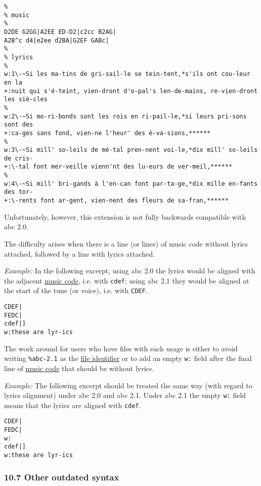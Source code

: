 \begin{verbatim}
%
% music
%
D2DE G2GG|A2EE ED-D2|c2cc B2AG|
A2B^c d4|e2ee d2BA|G2EF GABc|
%
% lyrics
%
w:1\-~Si les ma-tins de gri-sail-le se tein-tent,*s'ils ont cou-leur en la
+:nuit qui s'é-teint, vien-dront d'o-pal's len-de-mains, re-vien-dront les siè-cles
%
w:2\-~Si mo-ri-bonds sont les rois en ri-pail-le,*si leurs pri-sons sont des
+:ca-ges sans fond, vien-ne l'heur' des é-va-sions,******
%
w:3\-~Si mill' so-leils de mé-tal pren-nent voi-le,*dix mill' so-leils de cris-
+:\-tal font mer-veille vienn'nt des lu-eurs de ver-meil,******
%
w:4\-~Si mill' bri-gands à l'en-can font par-ta-ge,*dix mille en-fants des tor-
+:\-rents font ar-gent, vien-nent des fleurs de sa-fran,******
\end{verbatim}

Unfortunately, however, this extension is not fully backwards compatible
with abc 2.0.

The difficulty arises when there is a line (or lines) of music code
without lyrics attached, followed by a line with lyrics attached.

\emph{Example:} In the following excerpt, using abc 2.0 the lyrics would
be aligned with the adjacent
\protect\hyperlink{music_code_definition}{music code}, i.e. with
\texttt{cdef}; using abc 2.1 they would be aligned at the start of the
tune (or voice), i.e. with \texttt{CDEF}.

\begin{verbatim}
CDEF|
FEDC|
cdef|]
w:these are lyr-ics
\end{verbatim}

The work around for users who have files with such usage is either to
avoid writing \texttt{\%abc-2.1} as the
\protect\hyperlink{abc_file_identification}{file identifier} or to add
an empty \texttt{w:} field after the final line of
\protect\hyperlink{music_code_definition}{music code} that should be
without lyrics.

\emph{Example:} The following excerpt should be treated the same way
(with regard to lyrics alignment) under abc 2.0 and abc 2.1. Under abc
2.1 the empty \texttt{w:} field means that the lyrics are aligned with
\texttt{cdef}.

\begin{verbatim}
CDEF|
FEDC|
w:
cdef|]
w:these are lyr-ics
\end{verbatim}

\hypertarget{other_outdated_syntax}{\subsubsection{10.7 Other outdated
syntax}\label{other_outdated_syntax}}


